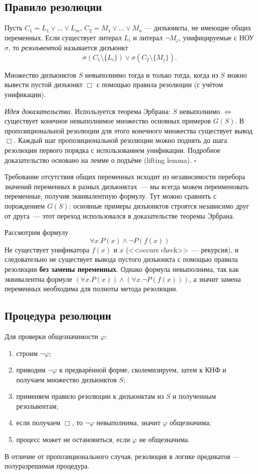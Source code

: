 \documentclass[10pt]{article}
\begin{document}
\subsection{Правило резолюции}
Пусть $C_1 = L_1\vee\dots\vee L_m$, $C_2 = M_1\vee\dots\vee M_n$ — дизъюнкты, не имеющие общих переменных. Если существует литерал $L_i$ и литерал $\neg M_j$, унифицируемые с НОУ $\sigma$, то \textit{резольвентой} называется дизъюнкт
\[
\sigma(C_1\setminus\{L_i\})\vee\sigma(C_2\setminus\{M_j\}).
\]
\begin{theorem}
Множество дизъюнктов $S$ невыполнимо тогда и только тогда, когда из $S$ можно вывести пустой дизъюнкт $\Box$ с помощью правила резолюции (с учётом унификации).
\end{theorem}
\textit{Идея доказательства.} Используется теорема Эрбрана: $S$ невыполнимо $\iff$ существует конечное невыполнимое множество основных примеров $G(S)$. В пропозициональной резолюции для этого конечного множества существует вывод $\Box$. Каждый шаг пропозициональной резолюции можно поднять до шага резолюции первого порядка с использованием унификации. Подробное доказательство основано на лемме о подъёме (lifting lemma). \hfill $\square$

\begin{remark}
Требование отсутствия общих переменных исходит из независимости перебора значений переменных в разных дизъюнктах~--- мы всегда можем переименовать переменные, получив эквивалентную формулу. Тут можно сравнить с порождением $G(S)$: основные примеры дизъюнктов строятся независимо друг от друга~--- этот переход использовался в доказательстве теоремы Эрбрана.
\end{remark}
\begin{example}
    Рассмотрим формулу $$\forall x. P(x) \wedge \neg P(f(x))$$
    Не существует унификатора $f(x)$ и $x$ (<<occurs check>>~--- рекурсия), и следовательно не существует вывода пустого дизъюнкта с помощью правила резолюции \textbf{без замены переменных}. Однако формула невыполнима, так как эквивалентна формуле $(\forall x. P(x)) \wedge (\forall x. \neg P(f(x)))$, а значит замена переменных необходима для полноты метода резолюции.
\end{example}

\subsection{Процедура резолюции}
Для проверки общезначимости $\varphi$:
\begin{enumerate}
  \item строим $\neg\varphi$;
  \item приводим $\neg\varphi$ к предварённой форме, сколемизируем, затем к КНФ и получаем множество дизъюнктов $S$;
  \item применяем правило резолюции к дизъюнктам из $S$ и полученным резольвентам;
  \item если получаем $\Box$, то $\neg\varphi$ невыполнима, значит $\varphi$ общезначима;
  \item процесс может не остановиться, если $\varphi$ не общезначима.
\end{enumerate}
В отличие от пропозиционального случая, резолюция в логике предикатов — полуразрешимая процедура.
\end{document}
